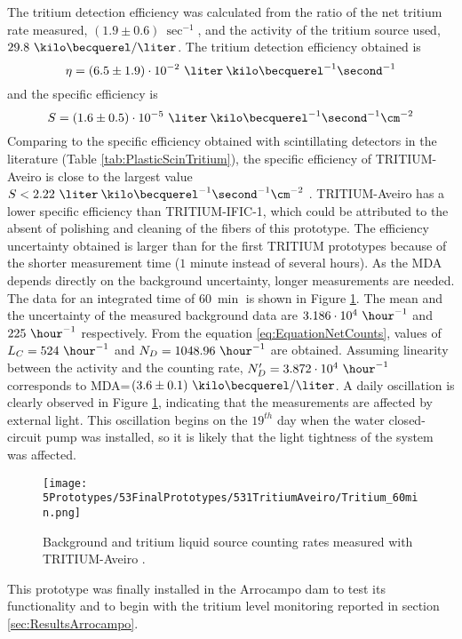 The tritium detection efficiency was calculated from the ratio of the net tritium rate measured, $(1.9 \pm 0.6)~\sec^{-1}$, and the activity of the tritium source used, $29.8~\kilo\becquerel/\liter$. The tritium detection efficiency obtained is $$\eta=(6.5 \pm 1.9)\cdot{} 10^{-2}~\liter\:\kilo\becquerel^{-1}\second^{-1}$$ and the specific efficiency is
$$S=(1.6 \pm 0.5)\cdot{} 10^{-5}~\liter\:\kilo\becquerel^{-1}\second^{-1}\cm^{-2}$$ 
Comparing to the specific efficiency obtained with scintillating detectors in the literature (Table \ref{tab:PlasticScinTritium}), the specific efficiency of TRITIUM-Aveiro is close to the largest value $S<2.22~\liter\:\kilo\becquerel^{-1}\second^{-1}\cm^{-2}$ \cite{Hofstetter1, Hofstetter2}. TRITIUM-Aveiro has a lower specific efficiency than TRITIUM-IFIC-1, which could be attributed to the absent of polishing and cleaning of the fibers of this prototype. The efficiency uncertainty obtained is larger than for the first TRITIUM prototypes because of the shorter measurement time ($1$ minute instead of several hours). As the MDA depends directly on the background uncertainty, longer measurements are needed. The data for an integrated time of $60~\min$ is shown in Figure \ref{fig:Tritium60min}. The mean and the uncertainty of the measured background data are $3.186 \cdot{} 10^{4}~\hour^{-1}$ and $225~\hour^{-1}$ respectively. From the equation \ref{eq:EquationNetCounts}, values of $L_C=524~\hour^{-1}$ and $N_D=1048.96~\hour^{-1}$ are obtained. Assuming linearity between the activity and the counting rate, $N_D'=3.872\cdot{}10^4~\hour^{-1}$ corresponds to MDA=$(3.6 \pm 0.1)~\kilo\becquerel/\liter$. A daily oscillation is clearly observed in Figure \ref{fig:Tritium60min}, indicating that the measurements are affected by external light. This oscillation begins on the $19^{th}$ day when the water closed-circuit pump was installed, so it is likely that the light tightness of the system was affected.
\begin{figure}[h]
\centering
\texttt{[image: 5Prototypes/53FinalPrototypes/531TritiumAveiro/Tritium\_60min.png]}
\caption{Background and tritium liquid source counting rates measured with TRITIUM-Aveiro \cite{ExperimentalPaperCarlos} \label{fig:Tritium60min}.}
\end{figure}
This prototype was finally installed in the Arrocampo dam to test its functionality and to begin with the tritium level monitoring reported in section \ref{sec:ResultsArrocampo}.